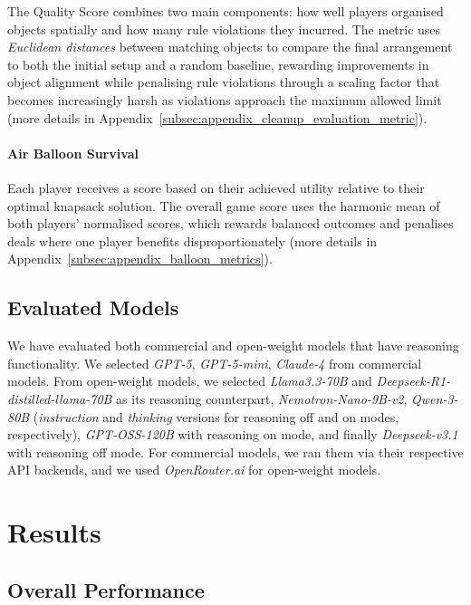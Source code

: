 \documentclass[11pt]{article}
\begin{document}
The Quality Score combines two main components: how well players organised objects spatially and how many rule violations they incurred. The metric uses \textit{Euclidean distances} between matching objects to compare the final arrangement to both the initial setup and a random baseline, rewarding improvements in object alignment while penalising rule violations through a scaling factor that becomes increasingly harsh as violations approach the maximum allowed limit 
(more details in Appendix~\ref{subsec:appendix_cleanup_evaluation_metric}).



\paragraph{Air Balloon Survival}

Each player receives a score based on their achieved utility relative to their optimal knapsack solution. The overall game score uses the harmonic mean of both players' normalised scores, which rewards balanced outcomes and penalises deals where one player benefits disproportionately (more details in Appendix~\ref{subsec:appendix_balloon_metrics}).

\subsection{Evaluated Models}

We have evaluated both commercial and open-weight models that have reasoning functionality. We selected \textit{GPT-5}, \textit{GPT-5-mini}, \textit{Claude-4} from commercial models. From open-weight models, we selected \textit{Llama3.3-70B} and \textit{Deepseek-R1-distilled-llama-70B} as its reasoning counterpart, \textit{Nemotron-Nano-9B-v2}, \textit{Qwen-3-80B} (\textit{instruction} and \textit{thinking} versions for reasoning off and on modes, respectively), \textit{GPT-OSS-120B} with reasoning on mode, and finally \textit{Deepseek-v3.1} with reasoning off mode. For commercial models, we ran them via their respective API backends, and we used \textit{OpenRouter.ai} for open-weight models.


\section{Results}

\subsection{Overall Performance}
\end{document}
